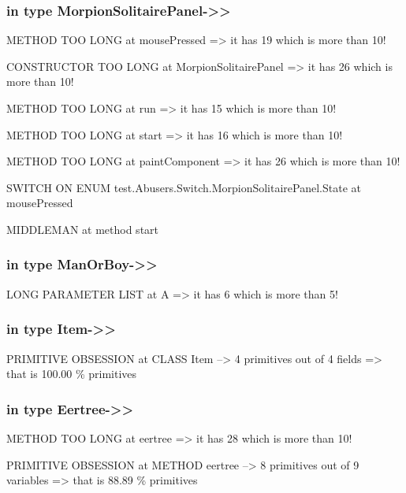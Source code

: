 \documentclass[a4paper]{article}
\begin{document}
\begin{flushleft}
	\subsubsection{in type
		MorpionSolitairePanel-\textgreater{}\textgreater{}}\label{in-type-morpionsolitairepanel-}

	METHOD TOO LONG at mousePressed =\textgreater{} it has 19 which is more
	than 10!

	CONSTRUCTOR TOO LONG at MorpionSolitairePanel =\textgreater{} it has 26
	which is more than 10!

	METHOD TOO LONG at run =\textgreater{} it has 15 which is more than 10!

	METHOD TOO LONG at start =\textgreater{} it has 16 which is more than
	10!

	METHOD TOO LONG at paintComponent =\textgreater{} it has 26 which is
	more than 10!

	SWITCH ON ENUM test.Abusers.Switch.MorpionSolitairePanel.State at
	mousePressed

	MIDDLEMAN at method start

	\subsubsection{in type
		ManOrBoy-\textgreater{}\textgreater{}}\label{in-type-manorboy-}

	LONG PARAMETER LIST at A =\textgreater{} it has 6 which is more than 5!

	\subsubsection{in type Item-\textgreater{}\textgreater{}}\label{in-type-item-}

	PRIMITIVE OBSESSION at CLASS Item --\textgreater{} 4 primitives out of 4
	fields =\textgreater{} that is 100.00 \% primitives

	\subsubsection{in type
		Eertree-\textgreater{}\textgreater{}}\label{in-type-eertree-}

	METHOD TOO LONG at eertree =\textgreater{} it has 28 which is more than
	10!

	PRIMITIVE OBSESSION at METHOD eertree --\textgreater{} 8 primitives out
	of 9 variables =\textgreater{} that is 88.89 \% primitives


\end{flushleft}
\end{document}
